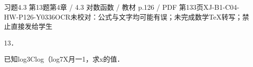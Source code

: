 \begin{bankitem}{习题4.3 第13题}{第4章 / 4.3 对数函数 / 教材 p.126 / PDF 第133页}{XJ-B1-C04-HW-P126-Y0336}{OCR未校对：公式与文字均可能有误；未完成数学TeX转写；禁止直接发给学生}
\begin{ocrdraft}
\par
13．
\par
已知log3Clog（log7X月一1，求x的值．
\end{ocrdraft}
\end{bankitem}
